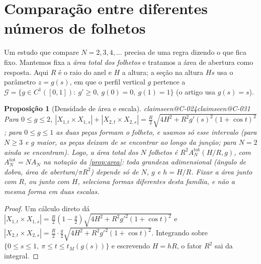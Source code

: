 \documentclass[11pt,a4paper]{article}
\makeatletter
\theoremstyle{plain}
\newtheorem{proposition}[theorem]{Proposição}
\theoremstyle{remark}
\newcommand{\claim}[1]{\ifcsname claimseen@#1\endcsname\else\expandafter\gdef\csname claimseen@#1\endcsname{}\label{claim:#1}\fi}
\makeatother
\begin{document}
\section{Comparação entre diferentes números de folhetos}\label{sec:compare}

Um estudo que compare $N=2,3,4,\dots$ precisa de uma regra dizendo o que fica fixo. Mantemos fixa a \emph{área total dos
folhetos} e tratamos a área de abertura como resposta. Aqui $R$ é o raio do anel e $H$ a altura; a seção na altura $Hs$ usa o
parâmetro $z=g(s)$, em que o perfil vertical $g$ pertence a
$\mathcal G=\{g\in C^1([0,1]):\ g'\ge0,\ g(0)=0,\ g(1)=1\}$ (o artigo usa $g(s)=s$).

\begin{proposition}[Densidade de área e escala]\label{prop:scaling}\claim{C-024}\claim{C-031}
Para $0\le g\le 2$, $|X_{1,t}\times X_{1,s}|+|X_{2,t}\times X_{2,s}|=\tfrac R2\sqrt{4H^2+R^2g'(s)^2(1+\cos t)^2}$; para
$0\le g\le1$ as duas peças formam o folheto, e usamos só esse intervalo (para $N\ge3$ e $g$ maior, as peças deixam de se
encontrar ao longo da junção; para $N=2$ ainda se encontram). Logo, a área total dos $N$ folhetos é
$R^2 A^{\mathrm{tot}}_N(H/R,g)$, com $A^{\mathrm{tot}}_N=N A_N$ na notação da \cref{prop:area}: toda grandeza adimensional
(ângulo de dobra, área de abertura$/\pi R^2$) depende só de $N$, $g$ e $h=H/R$. Fixar a área junto com $R$, ou junto com $H$,
seleciona formas \emph{diferentes} desta família, e não a mesma forma em duas escalas.
\end{proposition}
\begin{proof}
Um cálculo direto dá $|X_{1,t}\times X_{1,s}|=\frac R2(1-\frac g2)\sqrt{4H^2+R^2g'^2(1+\cos t)^2}$ e
$|X_{2,t}\times X_{2,s}|=\frac R2\cdot\frac g2\sqrt{4H^2+R^2g'^2(1+\cos t)^2}$. Integrando sobre
$\{0\le s\le1,\ \pi\le t\le t_M(g(s))\}$ e escrevendo $H=hR$, o fator $R^2$ sai da integral.
\end{proof}
\end{document}
